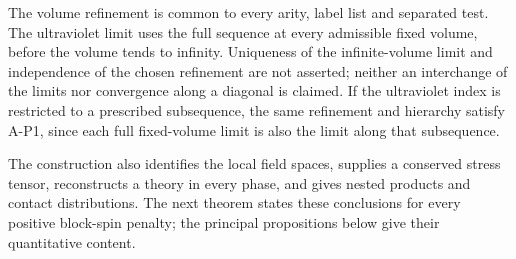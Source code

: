 \begin{remark}
The volume refinement is common to every arity, label list and separated test. The ultraviolet limit uses the full sequence at every admissible fixed volume, before the volume tends to infinity. Uniqueness of the infinite-volume limit and independence of the chosen refinement are not asserted; neither an interchange of the limits nor convergence along a diagonal is claimed. If the ultraviolet index is restricted to a prescribed subsequence, the same refinement and hierarchy satisfy A-P1, since each full fixed-volume limit is also the limit along that subsequence.
\end{remark}

The construction also identifies the local field spaces, supplies a conserved stress tensor, reconstructs a theory in every phase, and gives nested products and contact distributions. The next theorem states these conclusions for every positive block-spin penalty; the principal propositions below give their quantitative content.

